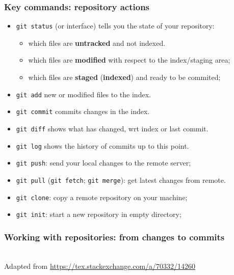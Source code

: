 \documentclass[10pt,svgnames,handout]{beamer}
\begin{document}
\begin{frame}
\frametitle{Key commands: repository actions}

\begin{itemize}[<+->]
\item \lstinline{git status} (or interface) tells you the state of your repository:
\begin{itemize}
  \item which files are \textbf{untracked} and not indexed.
  \item which files are \textbf{modified} with respect to the index/staging area;
  \item which files are \textbf{staged} (\textbf{indexed}) and ready to be commited;
\end{itemize}
\item \lstinline|git add| new or modified files to the index.
\item \lstinline|git commit| commits changes in the index.
\bigskip
\item \lstinline{git diff} shows what has changed, wrt index or last commit.
\item \lstinline{git log} shows the history of commits up to this point.
\bigskip
\item \lstinline|git push|: send your local changes to the remote server;
\item \lstinline|git pull| (\lstinline{git fetch}; \lstinline{git merge}): get latest changes from remote.
\bigskip
\item \lstinline|git clone|: copy a remote repository on your machine;
\item \lstinline|git init|: start a new repository in empty directory;
\end{itemize}
\end{frame}

\begin{frame}
\frametitle{Working with repositories: from changes to commits}
\\
Adapted from \url{https://tex.stackexchange.com/a/70332/14260}
\end{frame}
\end{document}
